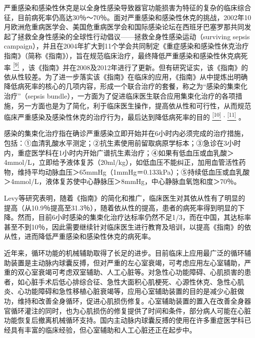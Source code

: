 严重感染和感染性休克是以全身性感染导致器官功能损害为特征的复杂的临床综合征，目前病死率仍高达30％～70％。面对严重感染和感染性休克的挑战，2002年10月欧洲危重病医学会、美国危重病医学会和国际感染论坛在西班牙巴塞罗那共同发起了拯救全身性感染的全球性行动倡议------拯救全身性感染运动（surviving
sepsis
campaign），并且在2004年扩大到11个学会共同制定《重症感染和感染性休克治疗指南》（简称《指南》），旨在规范临床治疗，最终降低严重感染和感染性休克病死率
\protect\hyperlink{text00008.htmlux5cux23ch9-7}{\textsuperscript{{[}9{]}}}
，该《指南》并在2008及2012年进行了更新。但有研究证实，该《指南》的依从性较差。为了进一步落实该《指南》在临床的应用，《指南》从中提炼出明确降低病死率的核心的几项内容，形成一个联合治疗的套餐，称之为“感染的集束化治疗”（sepsis
bundle），一方面为了促进临床医生联合应用集束化治疗的各项措施，另一方面也是为了简化，利于临床医生操作，提高依从性和可行性，从而规范临床严重感染及感染性休克的治疗行为，最后达到降低病死率的目的
\protect\hyperlink{text00008.htmlux5cux23ch10-7}{\textsuperscript{{[}10{]}}}
\textsuperscript{,}
\protect\hyperlink{text00008.htmlux5cux23ch11-7}{\textsuperscript{{[}11{]}}}
。

感染的集束化治疗指在确诊严重感染立即开始并在6小时内必须完成的治疗措施，包括：①血清乳酸水平测定；②抗生素使用前留取病原学标本；③急诊在3小时内，重症医学科在1小时内开始广谱抗生素治疗；④如果有低血压或血乳酸＞4mmol/L，立即给予液体复苏（20ml/kg），如低血压不能纠正，加用血管活性药物，维持平均动脉血压＞65mmHg（1mmHg＝0.133kPa）；⑤持续低血压或血乳酸＞4mmol/L，液体复苏使中心静脉压＞8mmHg，中心静脉血氧饱和度＞70％。

Levy等研究表明，随着《指南》的简化和推广，临床医生对其依从性有了明显的提高（从10.9％提高至31.3％），随着依从性的提高，患者的病死率得到明显的下降。然而，目前6小时感染的集束化治疗达标率仍然不足1/3，而在中国，其达标率甚至不到10％，因此需要继续针对临床医生进行教育及培训，以提高《指南》的依从性，进而降低严重感染和感染性休克的病死率。

近年来，循环功能的机械辅助取得了长足的进步。目前临床上应用最广泛的循环辅助装置是主动脉内球囊反搏，但对严重的左心室衰竭，可考虑应用左心室辅助，严重的双心室衰竭可考虑双室辅助、人工心脏等。对急性心功能障碍、心肌损害的患者，如心脏手术后低心排综合征、急性大面积心肌梗死、心源性休克、急性心肌炎、心功能障碍和急性移植心脏衰竭等，应用心室辅助装置的目的是减少心脏做功，维持和改善全身循环，促进心肌损伤修复。心室辅助装置的置入在改善全身器官循环灌注的同时，也为心肌损伤的修复提供了时间和条件，部分病人可能在心脏功能恢复后撤离机械循环支持。国内主动脉内球囊反搏的使用在许多重症医学科已经具有丰富的临床经验，但心室辅助和人工心脏还正在起步中。

